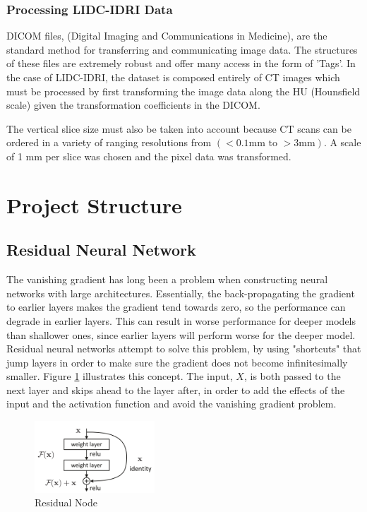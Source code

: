\documentclass[10pt,twocolumn,letterpaper]{article}
\begin{document}
      \subsubsection{Processing LIDC-IDRI Data} \label{sec:data-lidc-processing}
         DICOM files, (Digital Imaging and Communications in Medicine), are the standard method for transferring
         and communicating image data. The structures of these files are extremely robust and offer many access in
         the form of 'Tags'. In the case of LIDC-IDRI, the dataset is composed entirely of CT images which must be
         processed by first transforming the image data along the HU (Hounsfield scale) given the transformation
         coefficients in the DICOM.
    
         The vertical slice size must also be taken into account because CT scans can be ordered in a variety of
         ranging resolutions from $(<0.1\text{mm to } >3 \text{mm})$. A scale of 1 mm per slice was chosen and the
         pixel data was transformed.

\section{Project Structure} \label{sec:struct}

   \subsection{Residual Neural Network} \label{sec:struct-cnn}
        The vanishing gradient has long been a problem when constructing neural networks with large architectures. Essentially, the back-propagating the gradient to earlier layers makes the gradient tend towards zero, so the performance can degrade in earlier layers. This can result in worse performance for deeper models than shallower ones, since earlier layers will perform worse for the deeper model. Residual neural networks attempt to solve this problem, by using "shortcuts" that jump layers in order to make sure the gradient does not become infinitesimally smaller. Figure \ref{fig:struct-cnn-residual} illustrates this concept. The input, $X$, is both passed to the next layer and skips ahead to the layer after, in order to add the effects of the input and the activation function and avoid the vanishing gradient problem.

        \begin{figure}[h]
            \centering
            \includegraphics[width=0.4\textwidth]{./images/residual.png}
            \caption{Residual Node}
            \label{fig:struct-cnn-residual}
        \end{figure}
    
\end{document}
